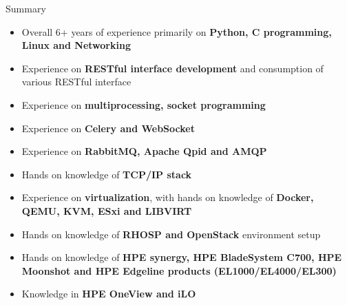 \documentclass{resume} %
\begin{document}
  



\begin{rSection}{Summary}
\begin{itemize}
\item Overall 6+ years of experience primarily on \textbf{Python, C programming, Linux and Networking}
\item Experience on \textbf{RESTful interface development} and consumption of various RESTful interface
\item Experience on \textbf{multiprocessing, socket programming}
\item Experience on \textbf{Celery and WebSocket}
\item Experience on \textbf{RabbitMQ, Apache Qpid and AMQP}
\item Hands on knowledge of \textbf{TCP/IP stack}
\item Experience on \textbf{virtualization}, with hands on knowledge of \textbf{Docker, QEMU, KVM, ESxi and LIBVIRT}
\item Hands on knowledge of \textbf{RHOSP and OpenStack} environment setup
\item Hands on knowledge of \textbf{HPE synergy, HPE BladeSystem C700, HPE Moonshot and HPE Edgeline products (EL1000/EL4000/EL300)}
\item Knowledge in \textbf{HPE OneView and iLO}
\end{itemize}



\end{rSection}


\end{document}
